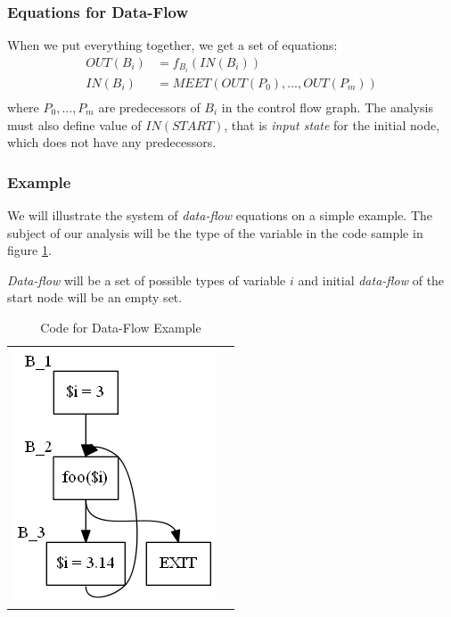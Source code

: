         \subsubsection*{Equations for Data-Flow}
        
        When we put everything together, we get a set of equations:
        \begin{align*}
            OUT(B_i) &= f_{B_i}(IN(B_i)) \\
            IN(B_i) &= \mathit{MEET}(OUT(P_0), ..., OUT(P_m)) \\ 
        \end{align*}
        where $P_0, ..., P_m$ are predecessors of $B_i$ in the 
        control flow graph. The analysis must also define value 
        of $IN(START)$, that is \emph{input state} for the 
        initial node, which does not have any predecessors.
        
        \subsubsection*{Example}
        We will illustrate the system of \emph{data-flow} equations on a 
        simple example. The subject of our analysis will be the 
        type of the variable  in the code sample in figure \ref{dfacfg}.
        
        \emph{Data-flow} will be a set of possible types of variable $i$ and 
        initial \emph{data-flow} of the start node will be an empty set.

\begin{table}[h]
  \begin{tabular}{ l | m{6cm} }
  \centering
    \includegraphics[scale=0.7]{img/dfa-cfg.png}
  &
 
\begin{minipage}{6cm}
\end{minipage}

  \\
  \end{tabular}
  \caption{Code for Data-Flow Example\label{dfacfg}}  
\end{table}

